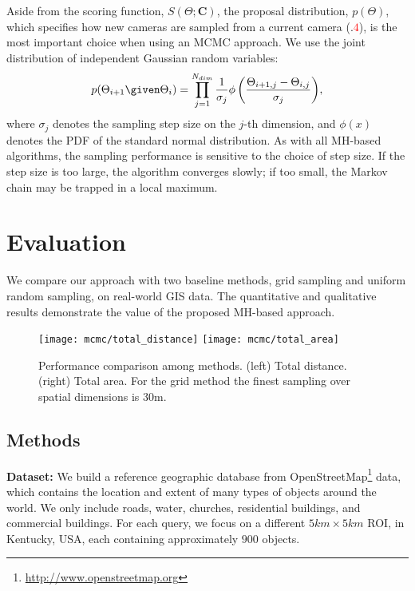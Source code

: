 Aside from the scoring function, $S(\Theta;\mathbf{C})$, the proposal
distribution, $p(\Theta)$, which specifies how new cameras are
sampled from a current camera
(.\textcolor{red}{$4$}), is the most important
choice when using an MCMC approach. We use the joint distribution of
independent Gaussian random variables:
%
\begin{displaymath}
  p(\Theta_{i+1} \given \Theta_i) = \prod_{j =
  1}^{N_{dim}}{\frac{1}{\sigma_j}\phi\left(\frac{\Theta_{i+1,j} -
\Theta_{i,j}}{\sigma_j}\right)},
\end{displaymath}
where $\sigma_j$ denotes the sampling step size on the $j$-th
dimension, and $\phi(x)$ denotes the PDF of the standard normal
distribution. As with all MH-based algorithms, the sampling
performance is sensitive to the choice of step size. If the step size
is too large, the algorithm converges slowly; if too small, the Markov
chain may be trapped in a local maximum. 

\section{Evaluation}
\label{sec:evaluation}

We compare our approach with two baseline methods, grid sampling and
uniform random sampling, on real-world GIS data. The quantitative and
qualitative results demonstrate the value of the proposed MH-based
approach.

\begin{figure}
  \centering
  \texttt{[image: mcmc/total\_distance]}
  \texttt{[image: mcmc/total\_area]}
  \caption{Performance comparison among methods. (left) Total
    distance. (right) Total area. For the grid method the finest
    sampling over spatial dimensions is 30m.}
  \label{fig:comparison}
\end{figure}

\subsection{Methods}

\textbf{Dataset:} 
We build a reference geographic database from
OpenStreetMap\footnote{\url{http://www.openstreetmap.org}} data, which
contains the location and extent of many types of objects around the
world. We only include roads, water, churches, residential buildings,
and commercial buildings. For each query, we focus on a different
$5km\times5 km$ ROI, in Kentucky, USA, each containing approximately
$900$ objects.

